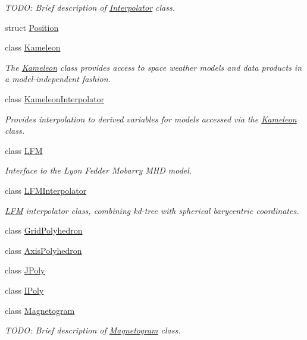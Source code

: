 \begin{DoxyCompactItemize}
\begin{DoxyCompactList}\small\item\em T\-O\-D\-O\-: Brief description of \hyperlink{classccmc_1_1_interpolator}{Interpolator} class. \end{DoxyCompactList}\item 
struct \hyperlink{structccmc_1_1_position}{Position}
\item 
class \hyperlink{classccmc_1_1_kameleon}{Kameleon}
\begin{DoxyCompactList}\small\item\em The \hyperlink{classccmc_1_1_kameleon}{Kameleon} class provides access to space weather models and data products in a model-\/independent fashion. \end{DoxyCompactList}\item 
class \hyperlink{classccmc_1_1_kameleon_interpolator}{Kameleon\-Interpolator}
\begin{DoxyCompactList}\small\item\em Provides interpolation to derived variables for models accessed via the \hyperlink{classccmc_1_1_kameleon}{Kameleon} class. \end{DoxyCompactList}\item 
class \hyperlink{classccmc_1_1_l_f_m}{L\-F\-M}
\begin{DoxyCompactList}\small\item\em Interface to the Lyon Fedder Mobarry M\-H\-D model. \end{DoxyCompactList}\item 
class \hyperlink{classccmc_1_1_l_f_m_interpolator}{L\-F\-M\-Interpolator}
\begin{DoxyCompactList}\small\item\em \hyperlink{classccmc_1_1_l_f_m}{L\-F\-M} interpolator class, combining kd-\/tree with spherical barycentric coordinates. \end{DoxyCompactList}\item 
class \hyperlink{classccmc_1_1_grid_polyhedron}{Grid\-Polyhedron}
\item 
class \hyperlink{classccmc_1_1_axis_polyhedron}{Axis\-Polyhedron}
\item 
class \hyperlink{classccmc_1_1_j_poly}{J\-Poly}
\item 
class \hyperlink{classccmc_1_1_i_poly}{I\-Poly}
\item 
class \hyperlink{classccmc_1_1_magnetogram}{Magnetogram}
\begin{DoxyCompactList}\small\item\em T\-O\-D\-O\-: Brief description of \hyperlink{classccmc_1_1_magnetogram}{Magnetogram} class. \end{DoxyCompactList}\item 

\end{DoxyCompactItemize}
